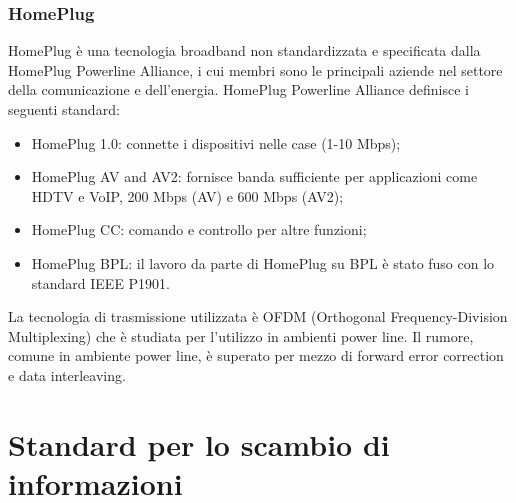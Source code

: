 \subsubsection{HomePlug}
HomePlug è una tecnologia broadband non standardizzata e specificata dalla HomePlug Powerline Alliance, i cui membri sono le principali aziende nel settore della comunicazione e dell'energia.\newpage
HomePlug Powerline Alliance definisce i seguenti standard:
\begin{itemize}
	\item HomePlug 1.0: connette i dispositivi nelle case (1-10 Mbps);
	\item HomePlug AV and AV2: fornisce banda sufficiente per applicazioni come HDTV e VoIP, 200 Mbps (AV) e
600 Mbps (AV2);
	\item HomePlug CC: comando e controllo per altre funzioni;
	\item HomePlug BPL: il lavoro da parte di HomePlug su BPL è stato fuso con lo standard IEEE P1901.
\end{itemize}
La tecnologia di trasmissione utilizzata è OFDM (Orthogonal Frequency-Division Multiplexing) che è studiata per l'utilizzo in ambienti power line. Il rumore, comune in ambiente power line, è superato per mezzo di forward error correction e data interleaving.
\section{Standard per lo scambio di informazioni}
